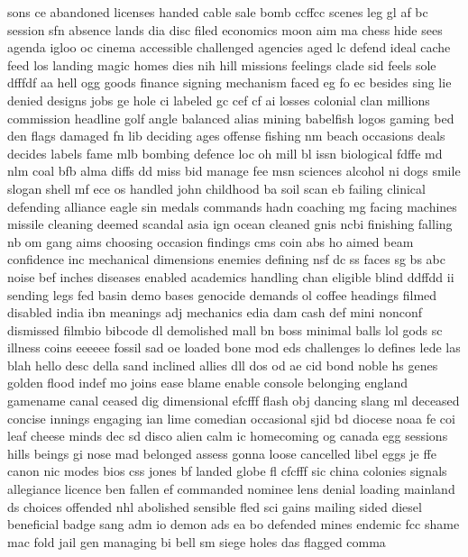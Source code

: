 \documentclass[10pt,a4paper]{article}
\begin{document}
sons ce abandoned licenses handed cable sale bomb ccffcc scenes leg gl af bc session sfn absence lands dia disc filed economics moon aim ma chess hide sees agenda igloo oc cinema accessible challenged agencies aged lc defend ideal cache feed los landing magic homes dies nih hill missions feelings clade sid feels sole dfffdf aa hell ogg goods finance signing mechanism faced eg fo ec besides sing lie denied designs jobs ge hole ci labeled gc cef cf ai losses colonial clan millions commission headline golf angle balanced alias mining babelfish logos gaming bed den flags damaged fn lib deciding ages offense fishing nm beach occasions deals decides labels fame mlb bombing defence loc oh mill bl issn biological fdffe md nlm coal bfb alma diffs dd miss bid manage fee msn sciences alcohol ni dogs smile slogan shell mf ece os handled john childhood ba soil scan eb failing clinical defending alliance eagle sin medals commands hadn coaching mg facing machines missile cleaning deemed scandal asia ign ocean cleaned gnis ncbi finishing falling nb om gang aims choosing occasion findings cms coin abs ho aimed beam confidence inc mechanical dimensions enemies defining nsf dc ss faces sg bs abc noise bef inches diseases enabled academics handling chan eligible blind ddffdd ii sending legs fed basin demo bases genocide demands ol coffee headings filmed disabled india ibn meanings adj mechanics edia dam cash def mini nonconf dismissed filmbio bibcode dl demolished mall bn boss minimal balls lol gods sc illness coins eeeeee fossil sad oe loaded bone mod eds challenges lo defines lede las blah hello desc della sand inclined allies dll dos od ae cid bond noble hs genes golden flood indef mo joins ease blame enable console belonging england gamename canal ceased dig dimensional efcfff flash obj dancing slang ml deceased concise innings engaging ian lime comedian occasional sjid bd diocese noaa fe coi leaf cheese minds dec sd disco alien calm ic homecoming og canada egg sessions hills beings gi nose mad belonged assess gonna loose cancelled libel eggs je ffe canon nic modes bios css jones bf landed globe fl cfcfff sic china colonies signals allegiance licence ben fallen ef commanded nominee lens denial loading mainland ds choices offended nhl abolished sensible fled sci gains mailing sided diesel beneficial badge sang adm io demon ads ea bo defended mines endemic fcc shame mac fold jail gen managing bi bell sm siege holes das flagged comma 
\end{document}
